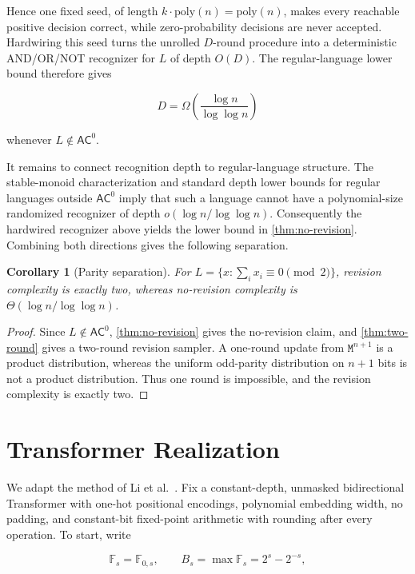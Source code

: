 \documentclass[10pt]{article}
\newtheorem{corollary}[theorem]{Corollary}
\theoremstyle{definition}
\newcommand{\AC}{\mathsf{AC}}
\newcommand{\mask}{\mathtt{M}}
\begin{document}
Hence one fixed seed, of length $k\cdot\mathrm{poly}(n)=\mathrm{poly}(n)$,
makes every reachable positive decision correct, while zero-probability
decisions are never accepted.  Hardwiring this seed turns the unrolled
$D$-round procedure into a deterministic AND/OR/NOT recognizer
for $L$ of depth $O(D)$.  The regular-language lower bound therefore gives

\begin{equation}
 D=\Omega\!\left(\frac{\log n}{\log\log n}\right)
\end{equation}

whenever $L\notin\AC^0$.

It remains to connect recognition depth to regular-language structure.  The
stable-monoid characterization and standard depth lower bounds for regular
languages outside $\AC^0$ imply that such a language cannot have a
polynomial-size randomized recognizer of depth
$o(\log n/\log\log n)$.  Consequently the hardwired recognizer above yields
the lower bound in \cref{thm:no-revision}.  Combining both directions gives
the following separation.

\begin{corollary}[Parity separation]
For
$L=\{x:\sum_i x_i\equiv0\pmod 2\}$, revision complexity is exactly two,
whereas no-revision complexity is
$\Theta(\log n/\log\log n)$.
\end{corollary}

\begin{proof}
Since $L\notin\AC^0$, \cref{thm:no-revision} gives the no-revision claim, and
\cref{thm:two-round} gives a two-round revision sampler.  A one-round update
from $\mask^{n+1}$ is a product distribution, whereas the uniform odd-parity
distribution on $n+1$ bits is not a product distribution.  Thus one round is
impossible, and the revision complexity is exactly two.
\end{proof}

\section{Transformer Realization}
\label{sec:transformer}

We adapt the method of Li et al.~\cite{li2024cot}.  Fix a constant-depth,
unmasked bidirectional Transformer with one-hot positional
encodings, polynomial embedding width, no padding, and constant-bit fixed-point
arithmetic with rounding after every operation.  To start, write

\begin{equation}
 \mathbb F_s=\mathbb F_{0,s},\qquad
 B_s=\max\mathbb F_s=2^s-2^{-s},
\end{equation}
\end{document}
